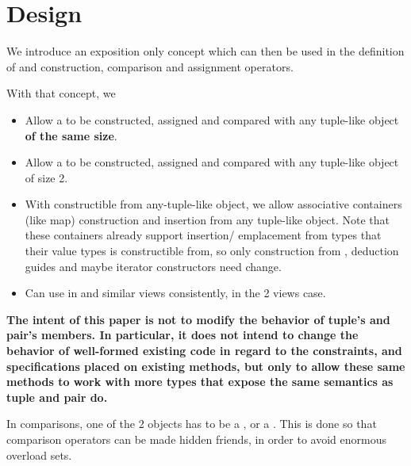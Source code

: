\documentclass{wg21}
\begin{document}
\section{Design}

We introduce an exposition only concept  which can then be used in the definition of  and  construction,
comparison and assignment operators.
%

With that concept, we

\begin{itemize}
    \item Allow a  to be constructed, assigned and compared with any tuple-like object \textbf{of the same size}.
    \item Allow a  to be constructed, assigned and compared with any tuple-like object of size 2.
    \item With  constructible from any-tuple-like object, we allow associative containers (like map) construction and insertion from any tuple-like object.
    Note that these containers already support insertion/ emplacement from types that their value types is constructible from, so only construction from ,
    deduction guides and maybe iterator constructors need change.
    \item Can use  in  and similar views consistently, in the 2 views case.
\end{itemize}

\textbf{The intent of this paper is not to modify the behavior of tuple's and pair's members. In particular, it does not intend to change the behavior of well-formed existing code in regard
to the constraints,  and  specifications placed on existing methods, but only to allow these same methods to work with more types that expose the same semantics as tuple and pair do.}

In comparisons, one of the 2 objects has to be a , or a . This is done so that comparison operators can be made hidden friends, in order to avoid enormous overload sets.
\end{document}
